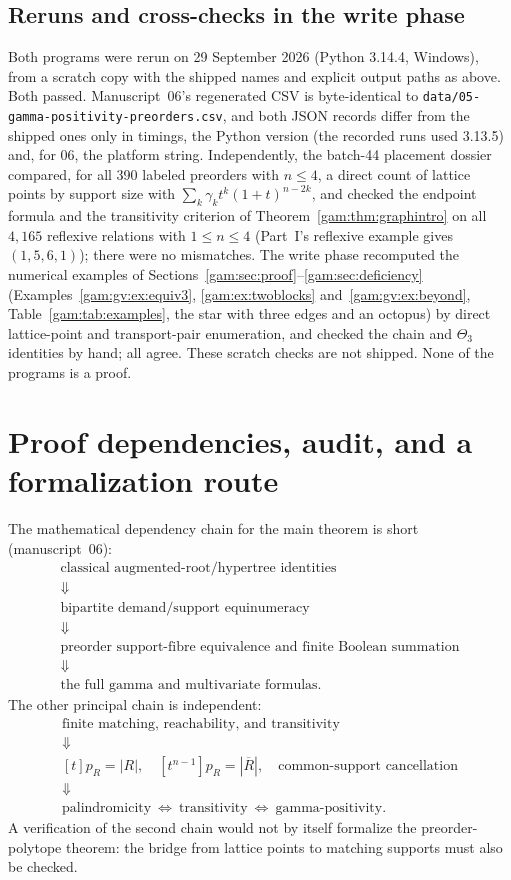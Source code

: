 \documentclass[11pt]{article}
\numberwithin{equation}{section}
\theoremstyle{definition}
\begin{document}
\subsection{Reruns and cross-checks in the write phase}
\label{gam:sec:build}
Both programs were rerun on 29 September 2026 (Python 3.14.4, Windows),
from a scratch copy with the shipped names and explicit output paths as
above. Both passed. Manuscript~06's regenerated CSV is byte-identical to
\nolinkurl{data/05-gamma-positivity-preorders.csv}, and both JSON records
differ from the shipped ones only in timings, the Python version (the
recorded runs used 3.13.5) and, for 06, the platform string. Independently,
the batch-44 placement dossier compared, for all 390 labeled preorders with
$n\le4$, a direct count of lattice points by support size with
$\sum_k\gamma_kt^k(1+t)^{n-2k}$, and checked the endpoint formula and the
transitivity criterion of Theorem~\ref{gam:thm:graphintro} on all $4{,}165$
reflexive relations with $1\le n\le4$ (Part~I's reflexive example gives
$(1,5,6,1)$); there were no mismatches. The write phase recomputed the
numerical examples of Sections~\ref{gam:sec:proof}--\ref{gam:sec:deficiency}
(Examples~\ref{gam:gv:ex:equiv3}, \ref{gam:ex:twoblocks} and~\ref{gam:gv:ex:beyond},
Table~\ref{gam:tab:examples}, the star with three edges and an octopus) by
direct lattice-point and transport-pair enumeration, and checked the chain
and $\Theta_3$ identities by hand; all agree. These scratch checks are not
shipped. None of the programs is a proof.

\section{Proof dependencies, audit, and a formalization route}\label{gam:sec:audit}
The mathematical dependency chain for the main theorem is short
(manuscript~06):
\[
 \begin{gathered}
 \text{classical augmented-root/hypertree identities}\\
 \Downarrow\\
 \text{bipartite demand/support equinumeracy}\\
 \Downarrow\\
 \text{preorder support-fibre equivalence and finite Boolean summation}\\
 \Downarrow\\
 \text{the full gamma and multivariate formulas.}
 \end{gathered}
\]
The other principal chain is independent:
\[
 \begin{gathered}
 \text{finite matching, reachability, and transitivity}\\
 \Downarrow\\
 [t]p_R=|R|,\quad[t^{n-1}]p_R=|\overline R|,\quad
 \text{common-support cancellation}\\
 \Downarrow\\
 \text{palindromicity}\ \Longleftrightarrow\ \text{transitivity}
 \ \Longleftrightarrow\ \text{gamma-positivity}.
 \end{gathered}
\]
A verification of the second chain would not by itself formalize the
preorder-polytope theorem: the bridge from lattice points to matching
supports must also be checked.
\end{document}
